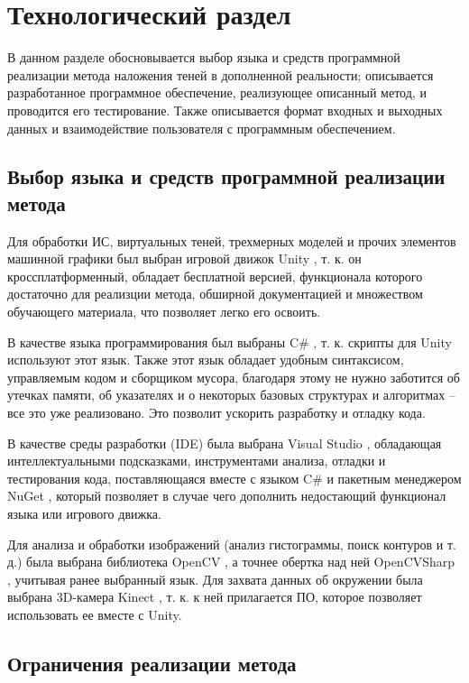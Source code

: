 \chapter{Технологический раздел}

В данном разделе обосновывается выбор языка и средств программной реализации метода наложения теней в дополненной реальности; описывается разработанное программное обеспечение, реализующее описанный метод, и проводится его тестирование. Также описывается формат входных и выходных данных и взаимодействие пользователя с программным обеспечением.

\section{Выбор языка и средств программной реализации метода}

Для обработки ИС, виртуальных теней, трехмерных моделей и прочих элементов машинной графики был выбран игровой движок Unity \cite{unity}, т. к. он кроссплатформенный, обладает бесплатной версией, функционала которого достаточно для реализции метода, обширной документацией и множеством обучающего материала, что позволяет легко его освоить. 

В качестве языка программирования был выбраны C\# \cite{c-sharp}, т. к. скрипты для Unity используют этот язык. Также этот язык обладает удобным синтаксисом, управляемым кодом и сборщиком мусора, благодаря этому не нужно заботится об утечках памяти, об указателях и о некоторых базовых структурах и алгоритмах -- все это уже реализовано. Это позволит ускорить разработку и отладку кода.

В качестве среды разработки (IDE) была выбрана Visual Studio \cite{vs}, обладающая интеллектуальными подсказками, инструментами анализа, отладки и тестирования кода, поставляющаяся вместе с языком C\# и пакетным менеджером NuGet \cite{nuget}, который позволяет в случае чего дополнить недостающий функционал языка или игрового движка.

Для анализа и обработки изображений (анализ гистограммы, поиск контуров и т. д.) была выбрана библиотека OpenCV \cite{opencv}, а точнее обертка над ней OpenCVSharp \cite{opencvsharp}, учитывая ранее выбранный язык. Для захвата данных об окружении была выбрана 3D-камера Kinect \cite{kinect}, т. к. к ней прилагается ПО, которое позволяет использовать ее вместе с Unity.

\section{Ограничения реализации метода}

